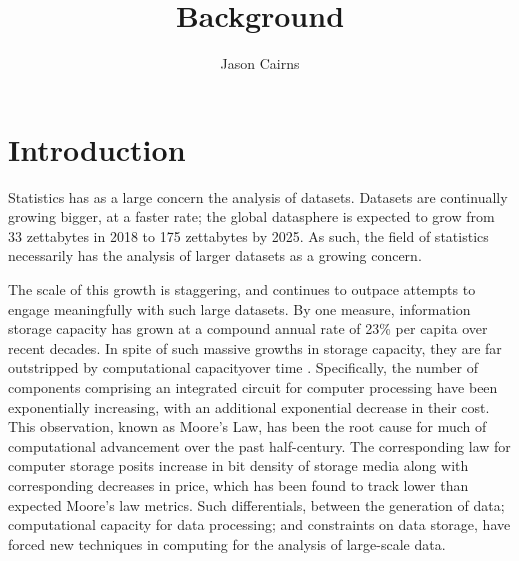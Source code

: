 \documentclass[a4paper,10pt]{article}
\begin{document}
\title{Background}
\author{Jason Cairns}
  
\maketitle

\section{Introduction}
Statistics has as a large concern the analysis of datasets.
Datasets are continually growing bigger, at a faster rate; the global datasphere is expected to grow from 33 zettabytes in 2018 to 175 zettabytes by 2025\cite{rydning2018digitization}.
As such, the field of statistics necessarily has the analysis of larger datasets as a growing concern.

The scale of this growth is staggering, and continues to outpace attempts to engage meaningfully with such large datasets. By one measure, information storage capacity has grown at a compound annual rate of 23\% per capita over recent decades\cite{hilbert2011world}.
In spite of such massive growths in storage capacity, they are far outstripped by computational capacityover time \cite{fontana2018moore}.
Specifically, the number of components comprising an integrated circuit for computer processing have been exponentially increasing, with an additional exponential decrease in their cost\cite{moore1975progress}.
This observation, known as Moore's Law, has been the root cause for much of computational advancement over the past half-century.
The corresponding law for computer storage posits increase in bit density of storage media along with corresponding decreases in price, which has been found to track lower than expected  Moore's law metrics.
Such differentials, between the generation of data; computational capacity for data processing; and constraints on data storage, have forced new techniques in computing for the analysis of large-scale data.
\end{document}
